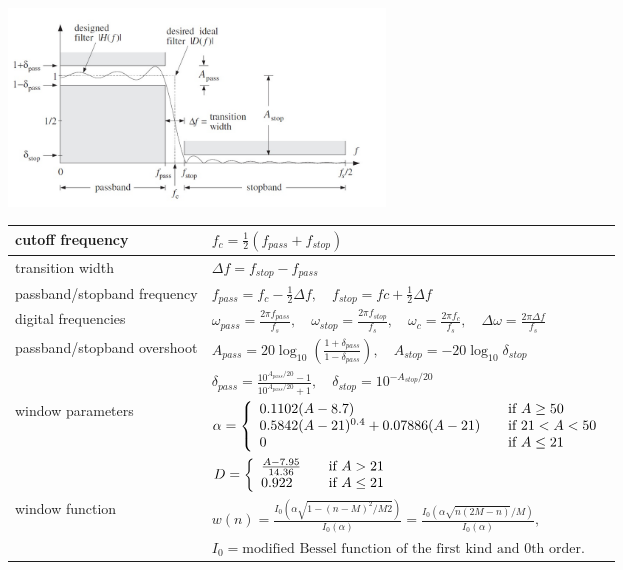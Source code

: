 \begin{center}
	\includegraphics[width=10cm]{images/FIR_KaiserSpecs.jpg}
\end{center}

\begin{tabular}{|l|l|}
	\hline
	cutoff frequency & $f_c=\frac{1}{2}(f_{pass}+f_{stop})$ \\ \hline
	transition width & $\Delta f = f_{stop}-f_{pass}$\\ \hline
	passband/stopband frequency & $f_{pass} = f_c - \frac{1}{2}\Delta f,\quad f_{stop}= fc+\frac{1}{2}\Delta f$\\ \hline
	digital frequencies & $\omega_{pass}=\frac{2\pi f_{pass}}{f_s},\quad \omega_{stop}=\frac{2\pi f_{stop}}{f_s},\quad
						  \omega_{c}=\frac{2\pi f_c}{f_s},\quad \Delta\omega=\frac{2\pi \Delta f}{f_s}$\\ \hline
	passband/stopband overshoot & $A_{pass}=20\log_{10}\left(\frac{1+\delta_{pass}}{1-\delta_{pass}}\right),\quad A_{stop}=-20\log_{10}\delta_{stop}$\\
								& $\delta_{pass}=\frac{10^{A_{pass}/20}-1}{10^{A_{pass}/20}+1},\quad \delta_{stop} = 10^{-A_{stop}/20}$ \\ \hline
	window parameters &
		$\alpha = \left\{
					\begin{array}{l l}
						0.1102(A-8.7)& \quad \text{if } A \geq 50\\
						0.5842(A-21)^{0.4}+0.07886(A-21) & \quad \text{if }21 < A < 50\\
						0 & \quad \text{if } A \leq 21
					\end{array} \right. $\\
	&	$D = \left\{
					\begin{array}{l l}
						\frac{A-7.95}{14.36}& \quad \text{if } A>21\\
						0.922 & \quad \text{if } A \leq 21
					\end{array} \right. $\\ \hline
	window function & $w(n)=\frac{I_0(\alpha\sqrt{1-(n-M)^2/M2})}{I_0(\alpha)}=\frac{I_0(\alpha\sqrt{n(2M-n)}/M)}{I_0(\alpha)},$ \\
	& $I_0=\text{modified Bessel function of the first kind and 0th order.}$\\
	\hline						  
\end{tabular}
